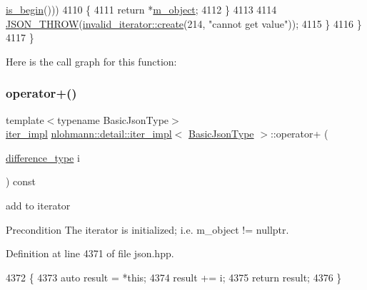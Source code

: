 \begin{DoxyCode}
      \hyperlink{classnlohmann_1_1detail_1_1primitive__iterator__t_a8d1a7d46b3fcd06edd034f04ededb5e4}{is\_begin}()))
4110                 \{
4111                     \textcolor{keywordflow}{return} *\hyperlink{classnlohmann_1_1detail_1_1iter__impl_aca84f84be598bdfaaddd23d928c42bbb}{m\_object};
4112                 \}
4113 
4114                 \hyperlink{json_8hpp_a6c274f6db2e65c1b66c7d41b06ad690f}{JSON\_THROW}(\hyperlink{classnlohmann_1_1detail_1_1invalid__iterator_a4e849260a3caa1b288c7e619130c6c09}{invalid\_iterator::create}(214, \textcolor{stringliteral}{"cannot get
       value"}));
4115             \}
4116         \}
4117     \}
\end{DoxyCode}
Here is the call graph for this function\+:
\mbox{\label{classnlohmann_1_1detail_1_1iter__impl_a8ef76aeb5a5032768f0f61f48ac189c0}} 
\subsubsection{\texorpdfstring{operator+()}{operator+()}}
{\footnotesize\ttfamily template$<$typename Basic\+Json\+Type$>$ \\
\hyperlink{classnlohmann_1_1detail_1_1iter__impl}{iter\+\_\+impl} \hyperlink{classnlohmann_1_1detail_1_1iter__impl}{nlohmann\+::detail\+::iter\+\_\+impl}$<$ \hyperlink{classnlohmann_1_1detail_1_1iter__impl_abf18f18793f84b0222aebb5a2a87da7a}{Basic\+Json\+Type} $>$\+::operator+ (\begin{DoxyParamCaption}\item[{\hyperlink{classnlohmann_1_1detail_1_1iter__impl_a2f7ea9f7022850809c60fc3263775840}{difference\+\_\+type}}]{i }\end{DoxyParamCaption}) const\hspace{0.3cm}{\ttfamily [inline]}}



add to iterator 

\begin{DoxyPrecond}{Precondition}
The iterator is initialized; i.\+e. {\ttfamily m\+\_\+object != nullptr}. 
\end{DoxyPrecond}


Definition at line 4371 of file json.\+hpp.


\begin{DoxyCode}
4372     \{
4373         \textcolor{keyword}{auto} result = *\textcolor{keyword}{this};
4374         result += i;
4375         \textcolor{keywordflow}{return} result;
4376     \}
\end{DoxyCode}
\mbox{\label{classnlohmann_1_1detail_1_1iter__impl_a7d2397773b2dce42f30f0375a6a1d850}} 

